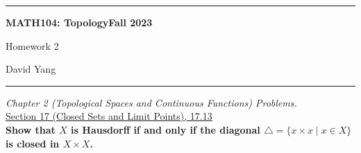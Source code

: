 \documentclass[11pt]{article}
\begin{document}
	\hrule
	\begin{center}
        \textbf{MATH104: Topology}\hfill \textbf{Fall 2023}\newline

		{\Large Homework 2}

		David Yang
	\end{center}

\hrule

\vspace{1em}

\textit{Chapter 2 (Topological Spaces and Continuous Functions) Problems.} \\

\underline{Section 17 (Closed Sets and Limit Points), 17.13} \\

\textbf{Show that $X$ is Hausdorff if and only if the diagonal $\triangle = \{ x \times x \mid x \in X \}$ is closed in $X \times X$.}
\end{document}
